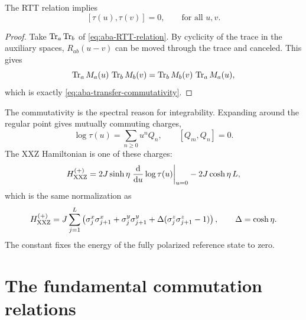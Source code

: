 \begin{theorem}
\label{thm:aba-commuting-transfer-matrices}
The RTT relation implies
\begin{equation}
\label{eq:aba-transfer-commutativity}
    [\tau(u),\tau(v)]=0,
    \qquad
    \text{for all }u,v .
\end{equation}
\end{theorem}

\begin{proof}
Take $\operatorname{Tr}_a\operatorname{Tr}_b$ of \cref{eq:aba-RTT-relation}.  By cyclicity of the trace in
the auxiliary spaces, $R_{ab}(u-v)$ can be moved through the trace and canceled.
This gives
\begin{equation}
    \operatorname{Tr}_a M_a(u)\,\operatorname{Tr}_b M_b(v)
    =
    \operatorname{Tr}_b M_b(v)\,\operatorname{Tr}_a M_a(u),
\end{equation}
which is exactly \cref{eq:aba-transfer-commutativity}.
\end{proof}

The commutativity is the spectral reason for integrability.  Expanding around the
regular point gives mutually commuting charges,
\begin{equation}
\label{eq:aba-conserved-charges-from-transfer}
    \log\tau(u)=\sum_{n\geq0}u^n Q_n,
    \qquad
    [Q_m,Q_n]=0 .
\end{equation}
The XXZ Hamiltonian is one of these charges:
\begin{equation}
\label{eq:aba-xxz-from-log-transfer}
    H_{\rm XXZ}^{(+)}
    =
    2J\sinh\eta
    \left.\frac{\mathrm{d}}{\mathrm{d} u}\log\tau(u)\right|_{u=0}
    -2J\cosh\eta\,L,
\end{equation}
which is the same normalization as
\begin{equation}
\label{eq:aba-xxz-hamiltonian}
    H_{\rm XXZ}^{(+)}
    =
    J\sum_{j=1}^{L}
    \left(
        \sigma_j^x\sigma_{j+1}^x
        +\sigma_j^y\sigma_{j+1}^y
        +\Delta(\sigma_j^z\sigma_{j+1}^z-1)
    \right),
    \qquad
    \Delta=\cosh\eta .
\end{equation}
The constant fixes the energy of the fully polarized reference state to zero.

\section{The fundamental commutation relations}
\label{sec:aba-fundamental-commutation-relations}

